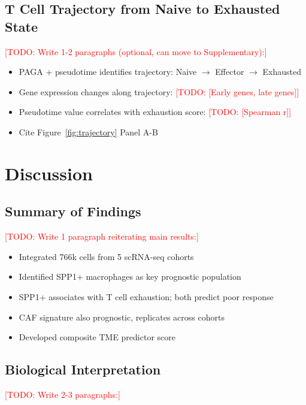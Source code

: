 \documentclass[12pt,oneside]{article}
\newcommand{\TODO}[1]{\textcolor{red}{[TODO: #1]}}
\newcommand{\FIG}[1]{Figure~\ref{fig:#1}}
\begin{document}
\subsection{T Cell Trajectory from Naive to Exhausted State}
\TODO{Write 1-2 paragraphs (optional, can move to Supplementary):}
\begin{itemize}
    \item PAGA + pseudotime identifies trajectory: Naive $\to$ Effector $\to$ Exhausted
    \item Gene expression changes along trajectory: \TODO{[Early genes, late genes]}
    \item Pseudotime value correlates with exhaustion score: \TODO{[Spearman r]}
    \item Cite \FIG{trajectory} Panel A-B
\end{itemize}

\section{Discussion}

\subsection{Summary of Findings}
\TODO{Write 1 paragraph reiterating main results:}
\begin{itemize}
    \item Integrated 766k cells from 5 scRNA-seq cohorts
    \item Identified SPP1+ macrophages as key prognostic population
    \item SPP1+ associates with T cell exhaustion; both predict poor response
    \item CAF signature also prognostic, replicates across cohorts
    \item Developed composite TME predictor score
\end{itemize}

\subsection{Biological Interpretation}
\TODO{Write 2-3 paragraphs:}
\end{document}
